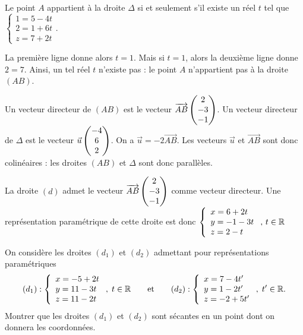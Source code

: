 \documentclass[11pt,fleqn, openany]{book} %
\begin{document}
\begin{solution}Le point \(A\) appartient à la droite \(\Delta\) si et seulement s'il existe un réel \(t\) tel que $\renewcommand{\arraystretch}{1}\left\{\begin{array}{l} 1 = 5 -4t \\ 2 = 1+6t \\ z = 7+2t \end{array}\right.$.

	La première ligne donne alors \(t=1\). Mais si \(t=1\), alors la deuxième ligne donne \(2=7\). Ainsi, un tel réel \(t\) n'existe pas : le point \(A\) n'appartient pas à la droite \((AB)\).
	
Un vecteur directeur de \((AB)\) est le vecteur \(\overrightarrow{AB}\renewcommand{\arraystretch}{1}\begin{pmatrix}2\\-3\\-1\end{pmatrix}\). Un vecteur directeur de \(\Delta\) est le vecteur \(\vec u \renewcommand{\arraystretch}{1}\begin{pmatrix}-4\\6\\2\end{pmatrix}\). On a \(\vec u = -2 \overrightarrow{AB}\). Les vecteurs \(\vec u\) et \(\overrightarrow{AB}\) sont donc colinéaires : les droites \((AB)\) et \(\Delta\) sont donc parallèles.

La droite $(d)$ admet le vecteur \(\overrightarrow{AB}\renewcommand{\arraystretch}{1}\begin{pmatrix}2\\-3\\-1\end{pmatrix}\) comme vecteur directeur. Une représentation paramétrique de cette droite est donc $\left\{\renewcommand{\arraystretch}{1}\begin{array}{l} x = 6 +2t \\ y = -1-3t \\ z = 2-t 
\end{array}\right. ,\, t\in \mathbb{R}$\end{solution}




\begin{exercise}On considère les droites $(d_1)$ et $(d_2)$ admettant pour représentations paramétriques
 \[ (d_1) : \left\{\renewcommand{\arraystretch}{1}\begin{array}{l} x = -5 +2t \\ y = 11-3t \\ z = 11-2t 

\end{array}\right. ,\; t\in \mathbb{R} \qquad \text{et}\qquad  (d_2) : \left\{\renewcommand{\arraystretch}{1}\begin{array}{l} x = 7 -4t' \\ y = 1-2t' \\ z = -2+5t' 

\end{array}\right. ,\; t'\in \mathbb{R}.\] 
Montrer que les droites $(d_1)$ et $(d_2)$ sont sécantes en un point dont on donnera les coordonnées.\end{exercise}
\end{document}
